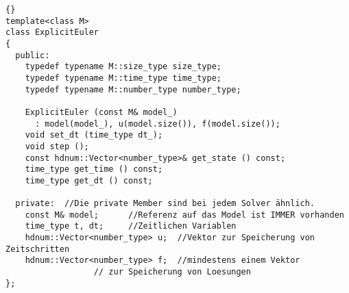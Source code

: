 {\footnotesize{\begin{lstlisting}{}
template<class M>
class ExplicitEuler
{
  public:
    typedef typename M::size_type size_type;
    typedef typename M::time_type time_type;
    typedef typename M::number_type number_type;

    ExplicitEuler (const M& model_)
      : model(model_), u(model.size()), f(model.size());
    void set_dt (time_type dt_);
    void step ();
    const hdnum::Vector<number_type>& get_state () const;
    time_type get_time () const;
    time_type get_dt () const;

  private:  //Die private Member sind bei jedem Solver ähnlich.
    const M& model;      //Referenz auf das Model ist IMMER vorhanden
    time_type t, dt;     //Zeitlichen Variablen
    hdnum::Vector<number_type> u;  //Vektor zur Speicherung von Zeitschritten
    hdnum::Vector<number_type> f;  //mindestens einem Vektor
                  // zur Speicherung von Loesungen
};
\end{lstlisting}}}

